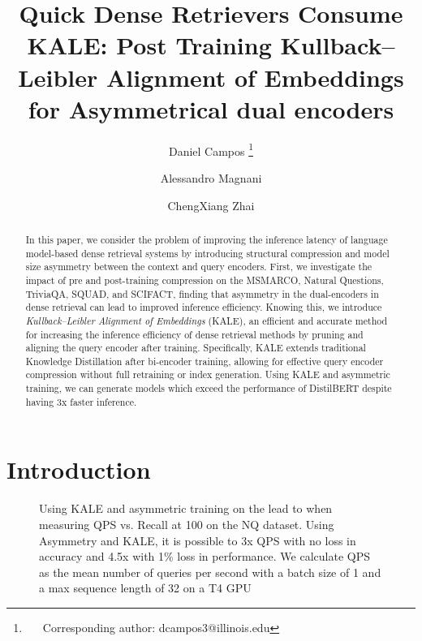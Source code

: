 \documentclass[11pt]{article}
\title{Quick Dense Retrievers Consume KALE: Post Training Kullback–Leibler Alignment of Embeddings for Asymmetrical dual encoders}
\author[1]{Daniel Campos \thanks{~~~Corresponding author: dcampos3@illinois.edu}}
\author[2]{Alessandro Magnani}
\author[1]{ChengXiang Zhai}
\affil[1]{Department of Computer Science, the University of Illinois Urbana-Champaign}
\affil[2]{Walmart Labs}
\begin{document}
\maketitle
\begin{abstract}
In this paper, we consider the problem of improving the inference latency of language model-based dense retrieval systems by introducing structural compression and model size asymmetry between the context and query encoders. First, we investigate the impact of pre and post-training compression on the MSMARCO, Natural Questions, TriviaQA, SQUAD, and SCIFACT, finding that asymmetry in the dual-encoders in dense retrieval can lead to improved inference efficiency. Knowing this, we introduce \emph{Kullback–Leibler Alignment of Embeddings} (KALE), an efficient and accurate method for increasing the inference efficiency of dense retrieval methods by pruning and aligning the query encoder after training. Specifically, KALE extends traditional Knowledge Distillation after bi-encoder training, allowing for effective query encoder compression without full retraining or index generation. Using KALE and asymmetric training, we can generate models which exceed the performance of DistilBERT despite having 3x faster inference. 
\end{abstract}
\section{Introduction}
\begin{figure}[!htb]
    \centering
    \caption{Using KALE and asymmetric training on the lead to when measuring QPS vs. Recall at 100 on the NQ dataset. Using Asymmetry and KALE, it is possible to 3x QPS with no loss in accuracy and 4.5x with 1\% loss in performance. We calculate QPS as the mean number of queries per second with a batch size of 1 and a max sequence length of 32 on a T4 GPU}
    \label{fig:speed}
\end{figure}

\end{document}
